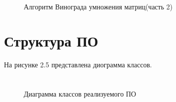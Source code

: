 \documentclass[12pt,a4paper]{report}
\begin{document}
\begin{figure}[ht!]
	\caption{Алгоритм Винограда умножения матриц(часть 2)}
\end{figure}

\section{Структура ПО}

На рисунке 2.5 представлена диограмма классов.

\section*{}
\begin{figure}[ht]
	\caption{Диаграмма классов реализуемого ПО}
\end{figure}
\end{document}
